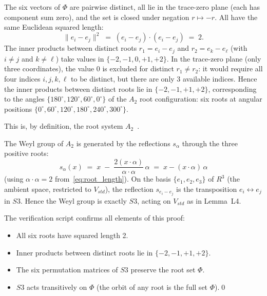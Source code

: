 \documentclass[11pt,a4paper]{article}
\def\Sthree{S3}%
\def\RR{R}%
\def\mathbb#1{#1}%
\def\mathrm#1{#1}%
\theoremstyle{plain}
\theoremstyle{definition}
\theoremstyle{remark}
\newcommand{\Sthree}{S_3}
\newcommand{\RR}{\mathbb{R}}
\begin{document}
The six vectors of $\Phi$ are pairwise distinct, all lie in the trace-zero plane (each has component sum zero), and the set is closed under negation $r \mapsto -r$. All have the same Euclidean squared length:
\begin{equation}
\|e_i - e_j\|^2 \;=\; (e_i - e_j) \cdot (e_i - e_j) \;=\; 2.
\label{eq:root_length}
\end{equation}
The inner products between distinct roots $r_1 = e_i - e_j$ and $r_2 = e_k - e_\ell$ (with $i \neq j$ and $k \neq \ell$) take values in $\{-2, -1, 0, +1, +2\}$. In the trace-zero plane (only three coordinates), the value 0 is excluded for distinct $r_1 \neq r_2$: it would require all four indices $i, j, k, \ell$ to be distinct, but there are only 3 available indices. Hence the inner products between distinct roots lie in $\{-2, -1, +1, +2\}$, corresponding to the angles $\{180^\circ, 120^\circ, 60^\circ, 0^\circ\}$ of the $A_2$ root configuration: six roots at angular positions $\{0^\circ, 60^\circ, 120^\circ, 180^\circ, 240^\circ, 300^\circ\}$.

This is, by definition, the root system $A_2$~\cite{Bourbaki_Lie,Humphreys_Lie}.

The Weyl group of $A_2$ is generated by the reflections $s_\alpha$ through the three positive roots:
\begin{equation}
s_\alpha(x) \;=\; x \;-\; \frac{2(x\cdot\alpha)}{\alpha\cdot\alpha}\,\alpha \;=\; x - (x\cdot\alpha)\,\alpha
\label{eq:Weyl_reflection}
\end{equation}
(using $\alpha\cdot\alpha = 2$ from~\eqref{eq:root_length}). On the basis $\{e_1, e_2, e_3\}$ of $\RR^3$ (the ambient space, restricted to $V_{\mathrm{std}}$), the reflection $s_{e_i - e_j}$ is the transposition $e_i \leftrightarrow e_j$ in $\Sthree$. Hence the Weyl group is exactly $\Sthree$, acting on $V_{\mathrm{std}}$ as in Lemma~L4.

The verification script confirms all elements of this proof:
\begin{itemize}[leftmargin=2em]
\item All six roots have squared length 2.
\item Inner products between distinct roots lie in $\{-2, -1, +1, +2\}$.
\item The six permutation matrices of $\Sthree$ preserve the root set $\Phi$.
\item $\Sthree$ acts transitively on $\Phi$ (the orbit of any root is the full set $\Phi$).\qed
\end{itemize}
\end{document}
